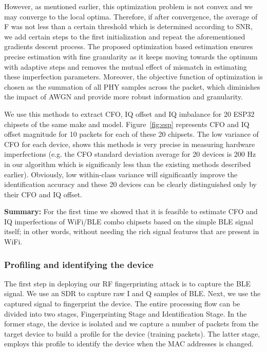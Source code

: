 However, as mentioned earlier, this optimization problem is not convex and we may converge to the local optima. Therefore, if after convergence, the average of F was not less than a certain threshold which is determined according to SNR, we add certain steps to the first initialization and repeat the aforementioned gradients descent process. The proposed optimization based estimation ensures precise estimation with fine granularity as it keeps moving towards the optimum with adaptive steps and removes the mutual effect of mismatch in estimating these imperfection parameters. Moreover, the objective function of optimization is chosen as the summation of all PHY samples across the packet, which diminishes the impact of AWGN and provide more robust information and granularity.

We use this methods to extract CFO, IQ offset and IQ imbalance for 20 ESP32 chipsets of the same make and model. Figure~\ref{fig:esp} represents CFO and IQ offset magnitude for 10 packets for each of these 20 chipsets. The low variance of CFO for each device, shows this methods is very precise in measuring hardware imperfections (e.g. the CFO standard deviation average for 20 devices is 200 Hz in our algorithm which is significanly less than the existing methods described earlier). Obviously, low within-class variance will significantly improve the identification accuracy and these 20 devices can be clearly distinguished only by their CFO and IQ offset. 
\fi

\vspace{0.5em}
\noindent\textbf{Summary:} For the first time we showed that it is feasible to estimate CFO and IQ imperfections of WiFi/BLE combo chipsets based on the simple BLE signal itself; in other words, without needing the rich signal features that are present in WiFi.


\subsubsection{Profiling and identifying the device}
\label{sec:methodology2}

The first step in deploying our RF fingerprinting attack is to capture the BLE signal. We use an SDR to capture raw I and Q samples of BLE. Next, we use the captured signal to fingerprint the device. The entire processing flow can be divided into two stages, Fingerprinting Stage and Identification Stage. In the former stage, the device is isolated and we capture a number of packets from the target device to build a profile for the device (training packets). The latter stage, employs this profile to identify the device when the MAC addresses is changed.

